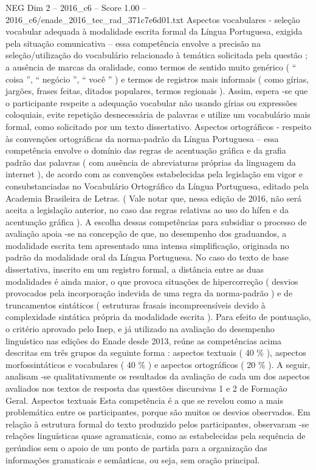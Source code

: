 \begin{textsample}{NEG Dim 2 – 2016\_c6 – Score 1.00 – 2016\_c6/enade\_2016\_tec\_rad\_371c7e6d01.txt}
Aspectos vocabulares - seleção vocabular adequada à modalidade escrita formal da Língua Portuguesa, exigida pela situação comunicativa – essa competência envolve a precisão na seleção/utilização do vocabulário relacionado à temática solicitada pela questão ; a ausência de marcas da oralidade, como termos de sentido muito genérico ( “ coisa ”, “ negócio ”, “ você ” ) e termos de registros mais informais ( como gírias, jargões, frases feitas, ditados populares, termos regionais ).
Assim, espera -se que o participante respeite a adequação vocabular não usando gírias ou expressões coloquiais, evite repetição desnecessária de palavras e utilize um vocabulário mais formal, como solicitado por um texto dissertativo.
Aspectos ortográficos - respeito às convenções ortográficas da norma-padrão da Língua Portuguesa – essa competência envolve o domínio das regras de acentuação gráfica e da grafia padrão das palavras ( com ausência de abreviaturas próprias da linguagem da internet ), de acordo com as convenções estabelecidas pela legislação em vigor e consubstanciadas no Vocabulário Ortográfico da Língua Portuguesa, editado pela Academia Brasileira de Letras. ( Vale notar que, nessa edição de 2016, não será aceita a legislação anterior, no caso das regras relativas ao uso do hífen e da acentuação gráfica ).
A escolha dessas competências para subsidiar o processo de avaliação apoia -se na concepção de que, no desempenho dos graduandos, a modalidade escrita tem apresentado uma intensa simplificação, originada no padrão da modalidade oral da Língua Portuguesa.
No caso do texto de base dissertativa, inscrito em um registro formal, a distância entre as duas modalidades é ainda maior, o que provoca situações de hipercorreção ( desvios provocados pela incorporação indevida de uma regra da norma-padrão ) e de truncamentos sintáticos ( estruturas frasais incompreensíveis devido à complexidade sintática própria da modalidade escrita ).
Para efeito de pontuação, o critério aprovado pelo Inep, e já utilizado na avaliação do desempenho linguístico nas edições do Enade desde 2013, reúne as competências acima descritas em três grupos da seguinte forma : aspectos textuais ( 40 \% ), aspectos morfossintáticos e vocabulares ( 40 \% ) e aspectos ortográficos ( 20 \% ).
A seguir, analisam -se qualitativamente os resultados da avaliação de cada um dos aspectos avaliados nos textos de resposta das questões discursivas 1 e 2 de Formação Geral.
Aspectos textuais Esta competência é a que se revelou como a mais problemática entre os participantes, porque são muitos os desvios observados.
Em relação à estrutura formal do texto produzido pelos participantes, observaram -se relações linguísticas quase agramaticais, como as estabelecidas pela sequência de gerúndios sem o apoio de um ponto de partida para a organização das informações gramaticais e semânticas, ou seja, sem oração principal.

\end{textsample}
